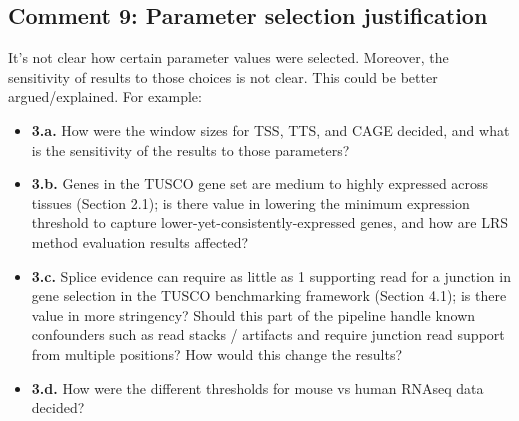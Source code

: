\documentclass[11pt]{article}
\begin{document}
\subsection{Comment 9: Parameter selection justification}

\begin{reviewercomment}
It's not clear how certain parameter values were selected. Moreover, the sensitivity of results to those choices is not clear. This could be better argued/explained. For example:

\begin{itemize}[leftmargin=*]
\item \textbf{3.a.} How were the window sizes for TSS, TTS, and CAGE decided, and what is the sensitivity of the results to those parameters?
\item \textbf{3.b.} Genes in the TUSCO gene set are medium to highly expressed across tissues (Section 2.1); is there value in lowering the minimum expression threshold to capture lower-yet-consistently-expressed genes, and how are LRS method evaluation results affected?
\item \textbf{3.c.} Splice evidence can require as little as 1 supporting read for a junction in gene selection in the TUSCO benchmarking framework (Section 4.1); is there value in more stringency? Should this part of the pipeline handle known confounders such as read stacks / artifacts and require junction read support from multiple positions? How would this change the results?
\item \textbf{3.d.} How were the different thresholds for mouse vs human RNAseq data decided?
\end{itemize}
\end{reviewercomment}
\end{document}
